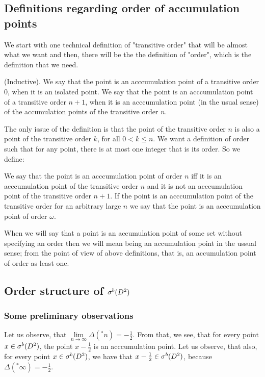 \subsection{Definitions regarding order of accumulation points}
\label{accumulation_points_definitions} 
We start with one technical definition of "transitive order" that will be almost what we want
and then, there will be the the definition of "order", which is the definition that we need. \\ 
\begin{definition}
(Inductive). 
We say that the point is an acccumulation point of a transitive order $0$, when it is 
an isolated point. 
We say that the point is an acccumulation point of a transitive order $n + 1$, when it is 
an acccumulation point (in the usual sense) of the accumulation points of the transitive order $n$. 
\end{definition}  
The only issue of the definition is that the point of the transitive order $n$ is also a point 
of the transitive order $k$, for all $0< k \leq n$. We want a definition of order such that 
for any point, there is at most one integer that is its order. So we define:
\begin{definition}
We say that the point is an acccumulation point of order $n$ iff it is an acccumulation point 
of the transitive order $n$ and it is not an acccumulation point of the transitive order $n+1$. 
If the point is an acccumulation point of the transitive order for an arbitrary large $n$ we say that 
the  point is an acccumulation point of order $\omega$.
\end{definition}

When we will say that a point is an accumulation point of some set without specifying an order 
then we will mean being an accumulation point in the ussual sense; from the point of view 
of above definitions, that is, an accumulation point of order as least one.

\subsection{Order structure of ${\mathcal{\sigma}^b(D^2)}$}
\subsubsection{Some preliminary observations}
Let us observe, that $\lim\limits_{n \to \infty} \Delta(^*n) = -\frac{1}{2}$. From that, we see, 
that for every point $x \in {\mathcal{\sigma}^b(D^2)}$, the point $x - \frac{1}{2}$ is an acccumulation point. 
Let us observe, that also, for every point $x \in {\mathcal{\sigma}^b(D^2)}$, we have that $x - \frac{1}{2} \in {\mathcal{\sigma}^b(D^2)}$, 
because $\Delta(^*\infty) = -\frac{1}{2}$. \\

